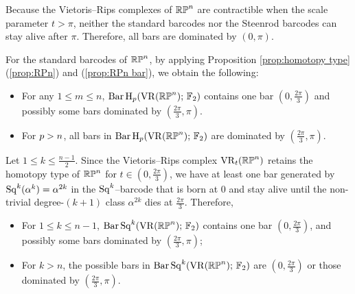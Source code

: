 
\subsubsection{} 
Because the Vietoris--Rips complexes of $\mathbb{RP}^n$ are contractible when the scale parameter $t>\pi$, neither the standard barcodes nor the Steenrod barcodes can stay alive after $\pi$.
Therefore, all bars are dominated by $(0,\pi)$.

For the standard barcodes of $\mathbb{RP}^n$, by applying Proposition \ref{prop:homotopy type} (\ref{prop:RPn}) and (\ref{prop:RPn bar}), %
we obtain the following:
\begin{itemize}
	\item For any $1 \leq m \leq n$, $\operatorname{Bar} \operatorname{H}_{p}(\operatorname{VR}(\mathbb{RP}^n);\,{\mathbb{F}_2})$ contains one bar $(0,\tfrac{2\pi}{3})$ and possibly some bars dominated by $(\tfrac{2\pi}{3}, \pi)$.
	\item For $p > n$, all bars in $\operatorname{Bar} \operatorname{H}_{p}(\operatorname{VR}(\mathbb{RP}^n);\,{\mathbb{F}_2})$ are dominated by $(\tfrac{2\pi}{3},\pi)$.
\end{itemize}


Let $1 \leq k \leq \tfrac{n-1}{2}$.
Since the Vietoris--Rips complex $\operatorname{VR}_t(\mathbb{RP}^n)$ retains the homotopy type of $\mathbb{RP}^n$ for $t \in (0,\tfrac{2\pi}{3})$, we have at least one bar generated by $\operatorname{Sq}^k(\alpha^k)=\alpha^{2k}$ in the $\operatorname{Sq}^k$--barcode that is born at $0$ and stay alive until the non-trivial degree-$(k+1)$ class $\alpha^{2k}$ dies at $\tfrac{2\pi}{3}$.
Therefore,
\begin{itemize}
	\item For $1\leq k\leq n-1$, $\operatorname{Bar}\operatorname{Sq}^{k}(\operatorname{VR}(\mathbb{RP}^n);\,{\mathbb{F}_2})$ contains one bar $(0,\tfrac{2\pi}{3})$, and possibly some bars dominated by $(\tfrac{2\pi}{3},\pi)$;
	\item For $k>n$, the possible bars in $\operatorname{Bar}\operatorname{Sq}^{k}(\operatorname{VR}(\mathbb{RP}^n);\,{\mathbb{F}_2})$ are $(0,\tfrac{2\pi}{3})$ or those dominated by $(\tfrac{2\pi}{3},\pi)$.
\end{itemize}

